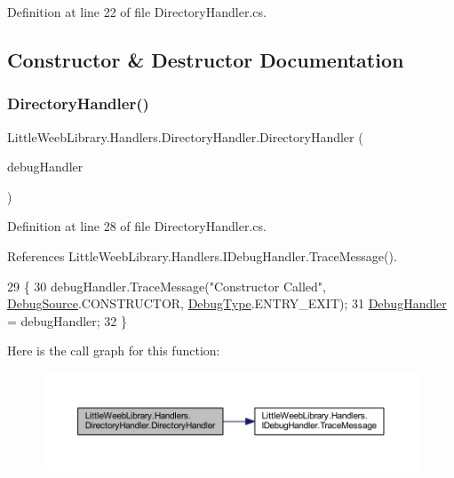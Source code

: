 Definition at line 22 of file Directory\+Handler.\+cs.



\subsection{Constructor \& Destructor Documentation}
\mbox{\label{class_little_weeb_library_1_1_handlers_1_1_directory_handler_a347ba4ee0182625434973769c90d06e1}} 
\subsubsection{\texorpdfstring{Directory\+Handler()}{DirectoryHandler()}}
{\footnotesize\ttfamily Little\+Weeb\+Library.\+Handlers.\+Directory\+Handler.\+Directory\+Handler (\begin{DoxyParamCaption}\item[{\mbox{\hyperlink{interface_little_weeb_library_1_1_handlers_1_1_i_debug_handler}{I\+Debug\+Handler}}}]{debug\+Handler }\end{DoxyParamCaption})}



Definition at line 28 of file Directory\+Handler.\+cs.



References Little\+Weeb\+Library.\+Handlers.\+I\+Debug\+Handler.\+Trace\+Message().


\begin{DoxyCode}
29         \{
30             debugHandler.TraceMessage(\textcolor{stringliteral}{"Constructor Called"}, \mbox{\hyperlink{namespace_little_weeb_library_1_1_handlers_a2a6ca0775121c9c503d58aa254d292be}{DebugSource}}.CONSTRUCTOR, 
      \mbox{\hyperlink{namespace_little_weeb_library_1_1_handlers_ab66019ed40462876ec4e61bb3ccb0a62}{DebugType}}.ENTRY\_EXIT);
31             \mbox{\hyperlink{class_little_weeb_library_1_1_handlers_1_1_directory_handler_adb882b8ec72046e2b95b6d11228f6927}{DebugHandler}} = debugHandler;
32         \}
\end{DoxyCode}
Here is the call graph for this function\+:\nopagebreak
\begin{figure}[H]
\begin{center}
\leavevmode
\includegraphics[width=350pt]{class_little_weeb_library_1_1_handlers_1_1_directory_handler_a347ba4ee0182625434973769c90d06e1_cgraph}
\end{center}
\end{figure}


